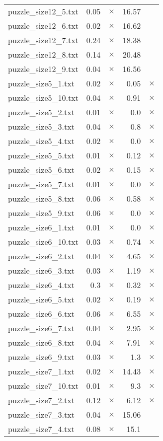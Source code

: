 \documentclass{article}
\begin{document}
\begin{center}
\begin{tabular}{lrrrr}
puzzle\_size12\_5.txt & 0.05 & 
$\times$
 & 16.57 & 
\\
puzzle\_size12\_6.txt & 0.02 & 
$\times$
 & 16.62 & 
\\
puzzle\_size12\_7.txt & 0.24 & 
$\times$
 & 18.38 & 
\\
puzzle\_size12\_8.txt & 0.14 & 
$\times$
 & 20.48 & 
\\
puzzle\_size12\_9.txt & 0.04 & 
$\times$
 & 16.56 & 
\\
puzzle\_size5\_1.txt & 0.02 & 
$\times$
 & 0.05 & 
$\times$
\\
puzzle\_size5\_10.txt & 0.04 & 
$\times$
 & 0.91 & 
$\times$
\\
puzzle\_size5\_2.txt & 0.01 & 
$\times$
 & 0.0 & 
$\times$
\\
puzzle\_size5\_3.txt & 0.04 & 
$\times$
 & 0.8 & 
$\times$
\\
puzzle\_size5\_4.txt & 0.02 & 
$\times$
 & 0.0 & 
$\times$
\\
puzzle\_size5\_5.txt & 0.01 & 
$\times$
 & 0.12 & 
$\times$
\\
puzzle\_size5\_6.txt & 0.02 & 
$\times$
 & 0.15 & 
$\times$
\\
puzzle\_size5\_7.txt & 0.01 & 
$\times$
 & 0.0 & 
$\times$
\\
puzzle\_size5\_8.txt & 0.06 & 
$\times$
 & 0.58 & 
$\times$
\\
puzzle\_size5\_9.txt & 0.06 & 
$\times$
 & 0.0 & 
$\times$
\\
puzzle\_size6\_1.txt & 0.01 & 
$\times$
 & 0.0 & 
$\times$
\\
puzzle\_size6\_10.txt & 0.03 & 
$\times$
 & 0.74 & 
$\times$
\\
puzzle\_size6\_2.txt & 0.04 & 
$\times$
 & 4.65 & 
$\times$
\\
puzzle\_size6\_3.txt & 0.03 & 
$\times$
 & 1.19 & 
$\times$
\\
puzzle\_size6\_4.txt & 0.3 & 
$\times$
 & 0.32 & 
$\times$
\\
puzzle\_size6\_5.txt & 0.02 & 
$\times$
 & 0.19 & 
$\times$
\\
puzzle\_size6\_6.txt & 0.06 & 
$\times$
 & 6.55 & 
$\times$
\\
puzzle\_size6\_7.txt & 0.04 & 
$\times$
 & 2.95 & 
$\times$
\\
puzzle\_size6\_8.txt & 0.04 & 
$\times$
 & 7.91 & 
$\times$
\\
puzzle\_size6\_9.txt & 0.03 & 
$\times$
 & 1.3 & 
$\times$
\\
puzzle\_size7\_1.txt & 0.02 & 
$\times$
 & 14.43 & 
$\times$
\\
puzzle\_size7\_10.txt & 0.01 & 
$\times$
 & 9.3 & 
$\times$
\\
puzzle\_size7\_2.txt & 0.12 & 
$\times$
 & 6.12 & 
$\times$
\\
puzzle\_size7\_3.txt & 0.04 & 
$\times$
 & 15.06 & 
\\
puzzle\_size7\_4.txt & 0.08 & 
$\times$
 & 15.1 & 
\\
\hline\end{tabular}
\end{center}
\end{document}
